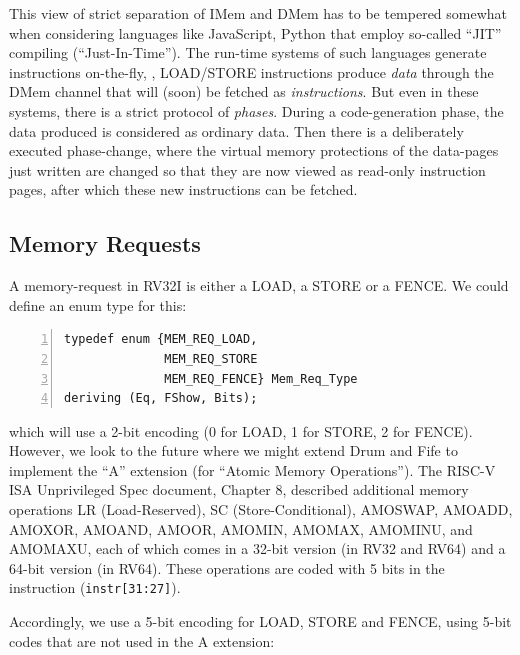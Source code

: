 
This view of strict separation of IMem and DMem has to be tempered
somewhat when considering languages like JavaScript, Python {\etc}
that employ so-called ``JIT'' compiling (``Just-In-Time'').  The
run-time systems of such languages generate instructions on-the-fly,
{\ie}, LOAD/STORE instructions produce \emph{data} through the DMem
channel that will (soon) be fetched as \emph{instructions}.  But even
in these systems, there is a strict protocol of \emph{phases}.  During
a code-generation phase, the data produced is considered as ordinary
data.  Then there is a deliberately executed phase-change, where the
virtual memory protections of the data-pages just written are changed
so that they are now viewed as read-only instruction pages, after
which these new instructions can be fetched.


\subsection{Memory Requests}

\label{Sec_Mem_Req}


A memory-request in RV32I is either a LOAD, a STORE or a FENCE.  We
could define an enum type for this:

{\small
\begin{Verbatim}[frame=single, numbers=left]
typedef enum {MEM_REQ_LOAD,
              MEM_REQ_STORE
              MEM_REQ_FENCE} Mem_Req_Type
deriving (Eq, FShow, Bits);
\end{Verbatim}
}

which will use a 2-bit encoding (0 for LOAD, 1 for STORE, 2 for
FENCE).  However, we look to the future where we might extend Drum and
Fife to implement the ``A'' extension (for ``Atomic Memory
Operations'').  The RISC-V ISA Unprivileged Spec document, Chapter 8,
described additional memory operations LR (Load-Reserved), SC
(Store-Conditional), AMOSWAP, AMOADD, AMOXOR, AMOAND, AMOOR, AMOMIN,
AMOMAX, AMOMINU, and AMOMAXU, each of which comes in a 32-bit version
(in RV32 and RV64) and a 64-bit version (in RV64).  These operations
are coded with 5 bits in the instruction (\verb|instr[31:27]|).

Accordingly, we use a 5-bit encoding for LOAD, STORE and FENCE, using
5-bit codes that are not used in the A extension:

